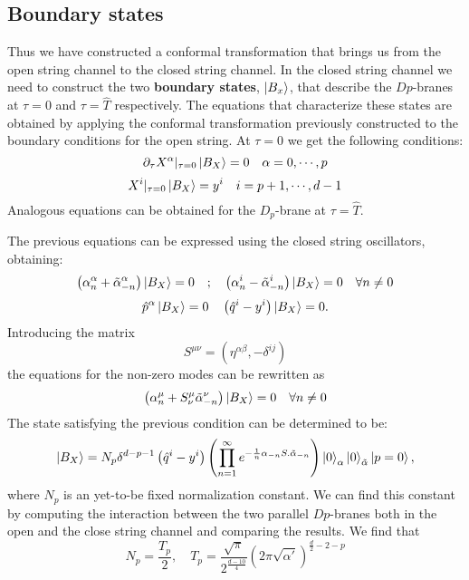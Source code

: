 \subsection{Boundary states}
Thus we have constructed a conformal transformation that brings us from the open string channel to the closed string channel. In the closed string channel we need to construct the two \textbf{boundary states}, $\ket{B_x}$, that describe the $Dp$-branes at $\tau = 0$ and $\tau = \hat{T}$ respectively. The equations that characterize these states are obtained by applying the conformal transformation previously constructed to the boundary conditions for the open string. At $\tau = 0$ we get the following conditions:
\begin{equation}
\partial_\tau X^\alpha\vert_{\tau=0}\ket{B_X} = 0\quad\alpha = 0,\cdots{},p
\end{equation}
\begin{equation}
X^i\vert_{\tau=0}\ket{B_X} = y^i\quad i=p+1,\cdots{},d-1
\end{equation}
Analogous equations can be obtained for the $D_p$-brane at $\tau = \hat{T}$.
\par The previous equations can be expressed using the closed string oscillators, obtaining:
\begin{equation}
\left(\alpha_n^\alpha + \tilde{\alpha}^\alpha_{-n}\right)\ket{B_X} = 0\quad;\quad \left(\alpha_n^i - \tilde{\alpha}^i_{-n}\right)\ket{B_X} = 0\quad \forall n \neq 0
\label{eq:overlap1}
\end{equation}
\begin{equation}
	\hat{p}^\alpha\ket{B_X} = 0 \quad \left(\hat{q}^i-y^i\right)\ket{B_X} = 0.
	\label{eq:overlap2}
\end{equation}
Introducing the matrix
\begin{equation}
	S^{\mu\nu} = \left(\eta^{\alpha\beta},-\delta^{ij}\right)
\label{smatrix}
\end{equation}
the equations for the non-zero modes can be rewritten as
\begin{equation}
	\left(\alpha^\mu_n + S^\mu_\nu\tilde{\alpha}^\nu_{-n}\right)\ket{B_X} = 0\quad \forall n \neq 0
\end{equation}
The state satisfying the previous condition can be determined to be:
\begin{equation}
	\ket{B_X} = N_p\delta^{d-p-1}\left(\hat{q}^i-y^i\right)\left(\prod_{n=1}^\infty{e^{-\frac{1}{n}\alpha_{-n}S.\tilde{\alpha}_{-n}}}\right)\ket{0}_{\alpha}\ket{0}_{\tilde{\alpha}}\ket{p=0},
\label{eq:staticboundarystate}
\end{equation}
where $N_p$ is an yet-to-be fixed normalization constant. We can find this constant by computing the interaction between the two parallel $Dp$-branes both in the open and the close string channel and comparing the results. We find that
\begin{equation}
	N_p = \frac{T_p}{2},\quad T_p = \frac{\sqrt{\pi}}{2^{\frac{d-10}{4}}}\left(2\pi\sqrt{\alpha'}\right)^{\frac{d}{2}-2-p}
\label{eq:normalization}
\end{equation}
